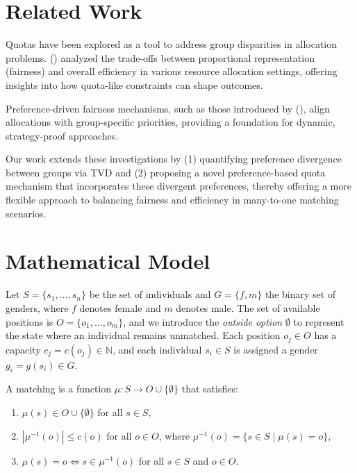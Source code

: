 \documentclass[letterpaper]{article}
\newcommand{\citet}[1]{\citeauthor{#1} (\citeyear{#1})}
\begin{document}
\section{Related Work}

Quotas have been explored as a tool to address group disparities in allocation problems. 
\citet{Bertsimas2012OnTE} analyzed the trade-offs between proportional representation (fairness) and overall efficiency in various resource allocation settings, offering insights into how quota-like constraints can shape outcomes. 

Preference-driven fairness mechanisms, such as those introduced by \citet{AzizW14}, align allocations with group-specific priorities, providing a foundation for dynamic, strategy-proof approaches.

Our work extends these investigations by (1) quantifying preference divergence between groups via TVD and (2) proposing a novel preference-based quota mechanism that incorporates these divergent preferences, thereby offering a more flexible approach to balancing 
fairness and efficiency in many-to-one matching scenarios.


\section{Mathematical Model}

Let \( S = \{s_1, \ldots, s_n\} \) be the set of individuals and \( G = \{f, m\} \) the binary set of genders, where \( f \) denotes female and \( m \) denotes male. The set of available positions is \( O = \{o_1, \ldots, o_m\} \), and we introduce the \textit{outside option} \( \emptyset \) to represent the state where an individual remains unmatched. Each position \( o_j \in O \) has a capacity \( c_j = c(o_j) \in \mathbb{N} \), and each individual \( s_i \in S \) is assigned a gender \( g_i = g(s_i) \in G \).

A matching is a function \( \mu : S \to O \cup \{\emptyset\} \) that satisfies:
\begin{enumerate}
    \item \( \mu(s) \in O \cup \{\emptyset\} \) for all \( s \in S \),
    \item  \( |\mu^{-1}(o)| \leq c(o) \) for all \( o \in O \), where \( \mu^{-1}(o) = \{ s \in S \mid \mu(s) = o \} \),
    \item \( \mu(s) = o \iff s \in \mu^{-1}(o) \) for all \( s \in S \) and \( o \in O \).
\end{enumerate}
\end{document}
